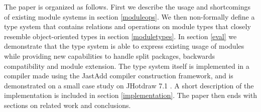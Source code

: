 The paper is organized as follows. First we describe the
usage and shortcomings of existing module systems in section \ref{moduleops}. We then non-formally
define a type system that contains relations and operations on module types 
that closely resemble object-oriented types in section \ref{moduletypes}. 
In section \ref{eval} we demonstrate that the type
system is able to express existing usage of modules while providing new
capabilities to handle split packages, backwards compatibility and module extension. The type system
itself is implemented in a compiler made using the JastAdd\cite{jastadd} compiler construction
framework, and is demonstrated on a small case study on JHotdraw 7.1 \cite{jhotdraw}.
A short description of the implementation is included in section \ref{implementation}.
The paper then ends with sections on related work and conclusions.
